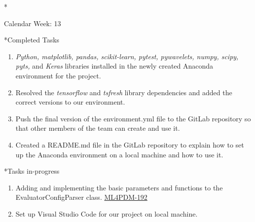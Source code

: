 \documentclass[11pt,a4paper]{article}
\begin{document}
\newpage
\begin{section}*{Calendar Week: 13 \hfill \date{02 April, 2021}}
 \begin{subsection}*{Completed Tasks}
     \begin{enumerate}
         \item \textit{Python, matplotlib, pandas, scikit-learn, pytest, pywavelets, numpy, scipy, pyts,} and \textit{Keras} libraries installed in the newly created Anaconda environment for the project.
         \item Resolved the \textit{tensorflow} and \textit{tsfresh} library dependencies and added the correct versions to our environment.
         \item Push the final version of the environment.yml file to the GitLab repository so that other members of the team can create and use it.
         \item Created a README.md file in the GitLab repository to explain how to set up the Anaconda environment on a local machine and how to use it.
     \end{enumerate}
 \end{subsection}

 \begin{subsection}*{Tasks in-progress}
     \begin{enumerate}
         \item Adding and implementing the basic parameters and functions to the EvaluatorConfigParser class. \href{https://ml4pdm.atlassian.net/browse/ML4PDM-192}{ML4PDM-192}
         \item Set up Visual Studio Code for our project on local machine.
     \end{enumerate}
 \end{subsection}
\end{section}
\end{document}
